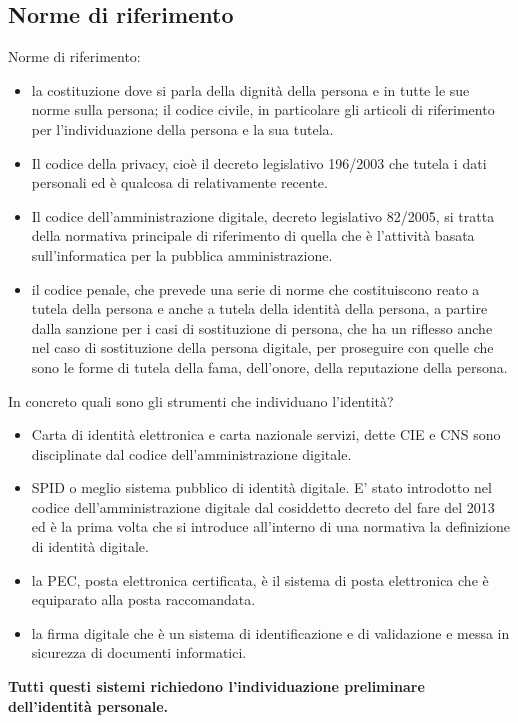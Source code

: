 \subsection{Norme di riferimento}
Norme di riferimento:
\begin{itemize}
    \item la costituzione dove si parla della dignità della persona e in tutte le sue norme sulla persona; il codice civile, in particolare gli articoli di riferimento per l'individuazione della persona e la sua tutela. 
    \item Il codice della privacy, cioè il decreto legislativo 196/2003 che tutela i dati personali ed è qualcosa di relativamente recente. 
    \item Il codice dell'amministrazione digitale, decreto legislativo 82/2005, si tratta della normativa principale di riferimento di quella che è l'attività basata sull'informatica per la pubblica amministrazione. 
    \item il codice penale, che prevede una serie di norme che costituiscono reato a tutela della persona e anche a tutela della identità della persona, a partire dalla sanzione per i casi di sostituzione di persona, che ha un riflesso anche nel caso di sostituzione della persona digitale, per proseguire con quelle che sono le forme di tutela della fama, dell'onore, della reputazione della persona.  
\end{itemize}

In concreto quali sono gli strumenti che individuano l'identità? 

\begin{itemize}
    \item Carta di identità elettronica e carta nazionale servizi, dette CIE e CNS sono disciplinate dal codice dell'amministrazione digitale.
    \item SPID o meglio sistema pubblico di identità digitale. E' stato introdotto nel codice dell'amministrazione digitale dal cosiddetto decreto del fare del 2013 ed è la prima volta che si introduce all'interno di una normativa la definizione di identità digitale. 
    \item la PEC, posta elettronica certificata, è il sistema di posta elettronica che è equiparato alla posta raccomandata. 
    \item la firma digitale che è un sistema di identificazione e di validazione e messa in sicurezza di documenti informatici. 
\end{itemize}

\textbf{Tutti questi sistemi richiedono l'individuazione preliminare dell'identità personale.}

